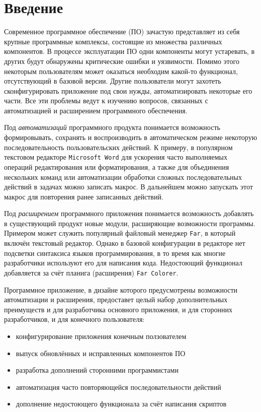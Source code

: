 \setcounter{secnumdepth}{0} %
\section{Введение}
\setcounter{secnumdepth}{2}

Современное программное обеспечение (ПО) зачастую представляет из себя крупные программные комплексы, состоящие из множества различных компонентов. В процессе эксплуатации ПО одни компоненты могут устаревать, в других будут обнаружены критические ошибки и уязвимости. Помимо этого некоторым пользователям может оказаться необходим какой-то функционал, отсутствующий в базовой версии. Другие пользователи могут захотеть сконфигурировать приложение под свои нужды, автоматизировать некоторые его части. Все эти проблемы ведут к изучению вопросов, связанных с автоматизацией и расширением программного обеспечения.

Под {\it автоматизаций} программного продукта понимается возможность формировывать, сохранять и воспроизводить в автоматическом режиме некоторую последовательность пользовательских действий. К примеру, в популярном текстовом редакторе {\tt Microsoft Word} для ускорения часто выполняемых операций редактирования или форматирования, а также для объединения нескольких команд или автоматизации обработки сложных последовательных действий в задачах можно записать макрос. В дальнейшем можно запускать этот макрос для повторения ранее записанных действий.

Под {\it расширением} программного приложения понимается возможность добавлять в существующий продукт новые модули, расширяющие возможности программы. Примером может служить популярный файловый менеджер {\tt Far}, в который включён текстовый редактор. Однако в базовой конфигурации в редакторе нет подсветки синтаксиса языков программирования, в то время как многие разработчики используют его для написания кода. Недостоющий функционал добавляется за счёт планига (расширения) {\tt Far Colorer}. 

Программное приложение, в дизайне которого предусмотрены возможности автоматизации и расширения, предоставет целый набор дополнительных преимуществ и для разработчика основного приложения, и для сторонних разработчиков, и для конечного пользователя:
\begin{itemize}
\item конфигурирование приложения конечным ползователем
\item выпуск обновлённых и исправленных компонентов ПО
\item разработка дополнений сторонними программистами
\item автоматизация часто повторяющейся последовательности действий
\item дополнение недостоющего функционала за счёт написания скриптов
\end{itemize}

